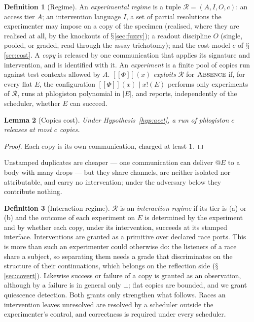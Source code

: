 \documentclass[11pt]{article}
\makeatletter
\theoremstyle{definition}
\newtheorem{definition}{Definition}[section]
\theoremstyle{plain}
\newtheorem{lemma}[definition]{Lemma}
\theoremstyle{remark}
\newcommand{\quo}[1]{@#1}
\newcommand{\out}[2]{#1!(#2)}
\newcommand{\enc}[1]{[\![#1]\!]}
\DeclareRobustCommand{\S}{\ifmmode\mathsection\else$\mathsection$\fi}
\newcommand{\ABS}{\textup{\textsc{Absence}}}
\newcommand{\Reg}{\mathcal{R}}
\makeatother
\begin{document}
\begin{definition}[Regime]\label{def:regime}
An \emph{experimental regime} is a tuple $\Reg = (A, I, O, c)$: an access
tier $A$; an intervention language $I$, a set of partial resolutions the
experimenter may impose on a copy of the specimen (realised, where they
are realised at all, by the knockouts of \S\ref{sec:fuzzy}); a readout discipline $O$ (single,
pooled, or graded, read through the assay trichotomy); and the cost
model $c$ of \S\ref{sec:cost}. A \emph{copy} is released by one
communication that applies its signature and intervention, and is
identified with it. An \emph{experiment} is a finite pool of copies run
against test contexts allowed by $A$. $\enc{\Phi}(x)$ \emph{exploits}
$\Reg$ for $\ABS$ if, for every flat $E$, the configuration
$\enc{\Phi}(x) \mid \out{x}{E}$ performs only experiments of $\Reg$, runs
at phlogiston polynomial in $|E|$, and reports, independently of the
scheduler, whether $E$ can succeed.
\end{definition}

\begin{lemma}[Copies cost]\label{lem:copies}
Under Hypothesis~\ref{hyp:acct}, a run of phlogiston $c$ releases at most
$c$ copies.
\end{lemma}

\begin{proof}
Each copy is its own communication, charged at least $1$.
\end{proof}

Unstamped duplicates are cheaper --- one communication can deliver
$\quo{E}$ to a body with many drops --- but they share channels, are
neither isolated nor attributable, and carry no intervention; under the
adversary below they contribute nothing.

\begin{definition}[Interaction regime]\label{def:blackbox}
$\Reg$ is an \emph{interaction regime} if its tier is (a) or (b) and the
outcome of each experiment on $E$ is determined by the experiment and by
whether each copy, under its intervention, succeeds at its stamped
interface. Interventions are granted as a primitive over declared race
ports. This is more than such an experimenter could otherwise do: the
listeners of a race share a subject, so separating them needs a grade that
discriminates on the structure of their continuations, which belongs on
the reflection side (\S\ref{sec:covert}). Likewise success or failure
of a copy is granted as an observation, although by
\cite[Prop.~Asymmetry]{Scientist} a failure is in general only $\bot$;
flat copies are bounded, and we grant quiescence detection. Both grants
only strengthen what follows. Races an intervention leaves unresolved
are resolved by a scheduler outside the experimenter's control, and
correctness is required under every scheduler.
\end{definition}
\end{document}
